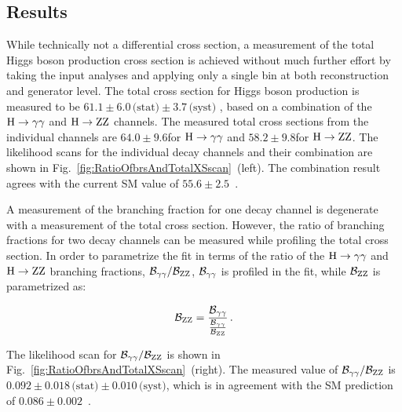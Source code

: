 \subsection{Results}
\label{sec:diffxs-results}

While technically not a differential cross section, a measurement of the total Higgs boson production cross section is achieved without much further effort by taking the input analyses and applying only a single bin at both reconstruction and generator level.
% 
The total cross section for Higgs boson production is measured to be
$61.1   \pm 6.0 \,\text{(stat)}   \pm 3.7 \,\text{(syst)}  $\pb
, based on a combination of the $\mathrm{H}\to\mathrm{\gamma}\mathrm{\gamma}$ and $\mathrm{H}\to\mathrm{Z}\mathrm{Z}$ channels.
% 
The measured total cross sections from the individual channels are $64.0\pm9.6$\pb for $\mathrm{H}\to\mathrm{\gamma}\mathrm{\gamma}$ and $58.2\pm9.8$\pb for $\mathrm{H}\to\mathrm{Z}\mathrm{Z}$.
% 
The likelihood scans for the individual decay channels and their combination are shown in Fig.~\ref{fig:RatioOfbrsAndTotalXSscan}~(left).
% 
The combination result agrees with the current SM value of $55.6\pm2.5$\pb~\cite{deFlorian:2016spz}.


A measurement of the branching fraction for one decay channel is degenerate with a measurement of the total cross section.
% 
However, the ratio of branching fractions for two decay channels can be measured while profiling the total cross section.
% 
In order to parametrize the fit in terms of the ratio of the $\mathrm{H}\to\mathrm{\gamma}\mathrm{\gamma}$ and $\mathrm{H}\to\mathrm{Z}\mathrm{Z}$ branching fractions, $\mathcal{B}_{\mathrm{\gamma}\mathrm{\gamma}}/\mathcal{B}_{\mathrm{Z}\mathrm{Z}}$, $\mathcal{B}_{\mathrm{\gamma}\mathrm{\gamma}}$ is profiled in the fit, while $\mathcal{B}_{\mathrm{Z}\mathrm{Z}}$ is parametrized as:
% 
\begin{linenomath*}
\begin{equation}
\mathcal{B}_{\mathrm{Z}\mathrm{Z}} = \frac{\mathcal{B}_{\mathrm{\gamma}\mathrm{\gamma}}}{ \frac{\mathcal{B}_{\mathrm{\gamma}\mathrm{\gamma}}}{\mathcal{B}_{\mathrm{Z}\mathrm{Z}}} }
\,.
\end{equation}
\end{linenomath*}
% 
The likelihood scan for $\mathcal{B}_{\mathrm{\gamma}\mathrm{\gamma}}/\mathcal{B}_{\mathrm{Z}\mathrm{Z}}$ is shown in Fig.~\ref{fig:RatioOfbrsAndTotalXSscan}~(right).
% 
The measured value of $\mathcal{B}_{\mathrm{\gamma}\mathrm{\gamma}}/\mathcal{B}_{\mathrm{Z}\mathrm{Z}}$ is
$0.092   \pm 0.018 \,\text{(stat)}   \pm 0.010 \,\text{(syst)}  $,
which is in agreement with the SM prediction of $0.086 \pm 0.002$~\cite{deFlorian:2016spz}.


